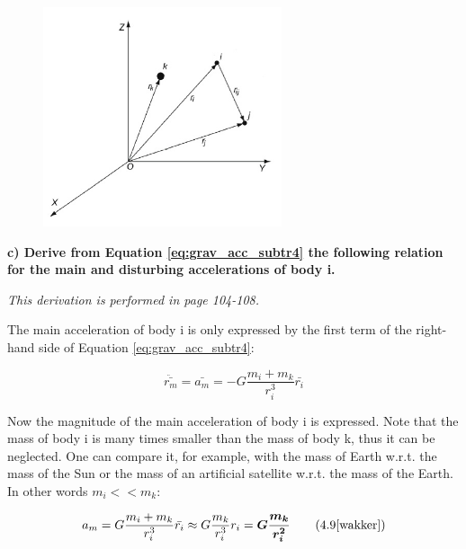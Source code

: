 \begin{figure}[ht]
    \centering
    \includegraphics[width=7cm]{img/grav_acc3.jpg}
    \label{fig:grav_acc_3}
\end{figure}










\noindent \textbf{c) Derive from Equation \ref{eq:grav_acc_subtr4} the following relation for the main and disturbing accelerations of body i.}

\bigskip

\noindent \textit{This derivation is performed in \cite{wakker} page 104-108.}

\bigskip

\noindent The main acceleration of body i is only expressed by the first term of the right-hand side of Equation \ref{eq:grav_acc_subtr4}:

\begin{equation}
    \ddot{\bar{r_{m}}} = \bar{a_{m}} = -G \frac{m_{i} + m_{k}}{r_{i}^3} \bar{r_{i}} 
    \label{eq:grav_acc_c1}
\end{equation}

\noindent Now the magnitude of the main acceleration of body i is expressed. Note that the mass of body i is many times smaller than the mass of body k, thus it can be neglected. One can compare it, for example, with the mass of Earth w.r.t. the mass of the Sun or the mass of an artificial satellite w.r.t. the mass of the Earth. In other words $m_i << m_k$:

\begin{equation}
    a_{m} = G \frac{m_{i} + m_{k}}{r_{i}^3} \bar{r_{i}} \approx G \frac{m_{k}}{r_{i}^3} r_{i} = \boldsymbol{G\frac{m_{k}}{r_{i}^2}}
    \tag{4.9\cite{wakker}}
    \label{eq:grav_acc_c2}
\end{equation}

